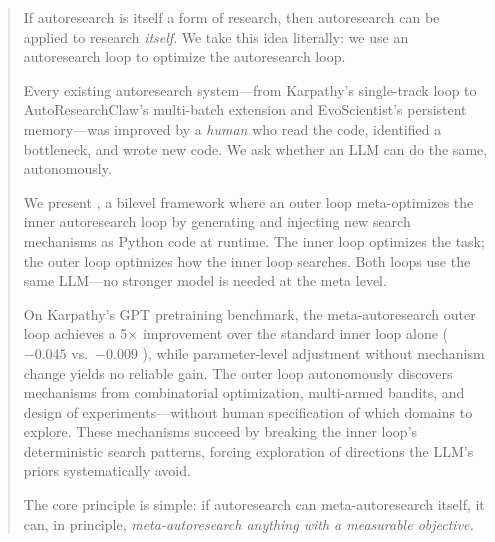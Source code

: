 \begin{abstract}
If autoresearch is itself a form of research, then autoresearch can be applied
to research \emph{itself}.
We take this idea literally:
we use an autoresearch loop to optimize the autoresearch loop.

Every existing autoresearch system---from Karpathy's single-track loop to
AutoResearchClaw's multi-batch extension and EvoScientist's persistent
memory---was improved by a \emph{human} who read the code, identified a
bottleneck, and wrote new code.
We ask whether an LLM can do the same, autonomously.

We present \textbf{\methodname{}}, a bilevel framework where an outer loop
meta-optimizes the inner autoresearch loop by generating and injecting new
search mechanisms as Python code at runtime.
The inner loop optimizes the task; the outer loop optimizes how the inner
loop searches.
Both loops use the same LLM---no stronger model is needed at the meta level.

On Karpathy's GPT pretraining benchmark, the meta-autoresearch outer loop
achieves a 5$\times$ improvement over the standard inner loop alone
($-0.045$ vs.\ $-0.009$ \valbpb{}), while parameter-level adjustment without
mechanism change yields no reliable gain.
The outer loop autonomously discovers mechanisms from combinatorial
optimization, multi-armed bandits, and design of experiments---without human
specification of which domains to explore.
These mechanisms succeed by breaking the inner loop's deterministic search
patterns, forcing exploration of directions the LLM's priors systematically avoid.

The core principle is simple:
if autoresearch can meta-autoresearch itself, it can, in principle,
\emph{meta-autoresearch anything with a measurable objective.}
\end{abstract}
